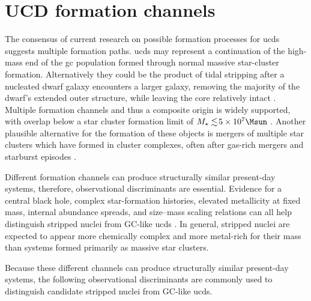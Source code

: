 \chapteropen
\chapter{UCD formation channels}
\label{app:ucd_channels}

The consensus of current research on possible formation processes for \glspl{ucd} \citep[e.g.][]{Norris_2011,Pfeffer_2013,Penny_2014,Norris_2014,Pfeffer_2014,Norris_2015,Pfeffer_2016,Goodman_2018,Mahani_2021,Saifollahi_2021,Mayes_2021, Pomeroy_2025} suggests multiple formation paths. \Glspl{ucd} may represent a continuation of the high-mass end of the \gls{gc} population formed through normal massive star-cluster formation. Alternatively they could be the product of tidal stripping after a nucleated dwarf galaxy encounters a larger galaxy, removing the majority of the dwarf's extended outer structure, while leaving the core relatively intact \citep{Bekki_2001}. Multiple formation channels and thus a composite origin is widely supported, with overlap below a star cluster formation limit of $M_\star\lesssim\!5\times10^7\Msun$ \citep{Norris_2019}. Another plausible alternative for the formation of these objects is mergers of multiple star clusters which have formed in cluster complexes, often after gas-rich mergers and starburst episodes \citep{Fellhauer_2002, Bruns_2011}.

Different formation channels can produce structurally similar present-day systems, therefore, observational discriminants are essential. Evidence for a central black hole, complex star-formation histories, elevated metallicity at fixed mass, internal abundance spreads, and size--mass scaling relations can all help distinguish stripped nuclei from GC-like \glspl{ucd} \citep[\eg][]{Pfeffer_2016,Norris_2019}. In general, stripped nuclei are expected to appear more chemically complex and more metal-rich for their mass than systems formed primarily as massive star clusters.

Because these different channels can produce structurally similar present-day systems, the following observational discriminants are commonly used to distinguish candidate stripped nuclei from GC-like \glspl{ucd}.

